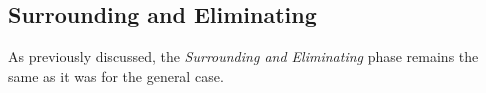 \subsection{Surrounding and Eliminating}
As previously discussed, the {\em Surrounding and Eliminating} phase remains the same as it was for the general case.

